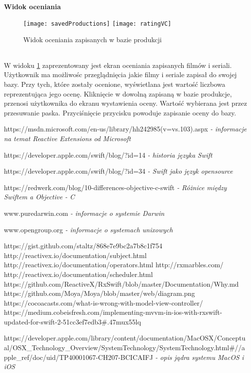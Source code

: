 \documentclass[12pt,oneside,a4paper]{report}
\begin{document}
\pagebreak
\subparagraph{}\textbf{Widok oceniania}
\begin{figure}[ht!]
	\centering
	\subfloat[]{}
	\texttt{[image: savedProductions]}
	\quad
	\subfloat[]{}
	\texttt{[image: ratingVC]}
	\caption{Widok oceniania zapisanych w bazie produkcji}
	\label{rating}
\end{figure}\\
W widoku \ref{rating} zaprezentowany jest ekran oceniania zapisanych filmów i seriali. Użytkownik ma możliwośc przeglądnięcia jakie filmy i seriale zapisał do swojej bazy. Przy tych, które zostały ocenione, wyświetlana jest wartość liczbowa reprezentująca jego ocenę. Kliknięcie w dowolną zapisaną w bazie produkcje, przenosi użytkownika do ekranu wystawienia oceny. Wartość wybierana jest przez przesuwanie paska. Przyciśnięcie przycisku powoduje zapisanie oceny do bazy. 
\begin{thebibliography}{50}
 https://msdn.microsoft.com/en-us/library/hh242985(v=vs.103).aspx
\emph{- informacje na temat Reactive Extensions od Microsoft}

 https://developer.apple.com/swift/blog/?id=14
\emph{- historia języka Swift}

 https://developer.apple.com/swift/blog/?id=34
\emph{- Swift jako język opensource}

 https://redwerk.com/blog/10-differences-objective-c-swift
\emph{- Różnice między Swiftem a Objective - C}

 www.puredarwin.com 
\emph{ - informacje o systemie Darwin}

 www.opengroup.org \emph{ - informacje o systemach unixowych}

 https://gist.github.com/staltz/868e7e9bc2a7b8c1f754
 http://reactivex.io/documentation/subject.html
http://reactivex.io/documentation/operators.html
http://rxmarbles.com/
http://reactivex.io/documentation/scheduler.html
https://github.com/ReactiveX/RxSwift/blob/master/Documentation/Why.md
https://github.com/Moya/Moya/blob/master/web/diagram.png
https://cocoacasts.com/what-is-wrong-with-model-view-controller/
https://medium.cobeisfresh.com/implementing-mvvm-in-ios-with-rxswift-updated-for-swift-2-51cc3ef7edb3\#.47mux55lq


 https://developer.apple.com/library/content/documentation/MacOSX/Conceptual/OSX\_Technology\_Overview/SystemTechnology/SystemTechnology.html\#//apple\_ref/doc/uid/TP40001067-CH207-BCICAIFJ
\emph{ - opis jądra systemu MacOS i iOS}


\end{thebibliography}
\end{document}
